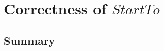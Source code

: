 \chapter[$StartTo$]{Correctness of $StartTo$}\label{ch17}

\newpage
\section{Summary}\label{ch17.summary}

\ldefsummary %
\lthmsummary %
\lthmaddeddefsummary %
\lthmaddedthmsummary %
\lzevessummary %
